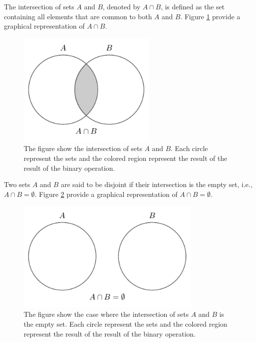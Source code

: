 \begin{definition}[Intersection]
	The intersection of sets $A$ and $B$, denoted by $A \cap B$, is defined as the set containing all elements that are common to both $A$ and $B$. Figure \ref{fig:set_intersection} provide a graphical representation of $A \cap B$.
	\begin{figure}[H]
		\centering
		\includegraphics[width = 0.6\textwidth]{figures/set_intersection.pdf}
		\caption{The figure show the intersection of sets $A$ and $B$. Each circle represent the sets and the colored region represent the result of the result of the binary operation.}
		\label{fig:set_intersection}
	\end{figure}
\end{definition}

\begin{definition}[Disjoint]
	Two sets $A$ and $B$ are said to be disjoint if their intersection is the empty set, i.e., $A \cap B = \emptyset$. Figure \ref{fig:set_disjoint} provide a graphical representation of $A \cap B=\emptyset$.
	\begin{figure}[H]
		\centering
		\includegraphics[width = 0.8\textwidth]{figures/set_disjoint.pdf}
		\caption{The figure show the case where the intersection of sets $A$ and $B$ is the empty set. Each circle represent the sets and the colored region represent the result of the result of the binary operation.}
		\label{fig:set_disjoint}
	\end{figure}
\end{definition}


